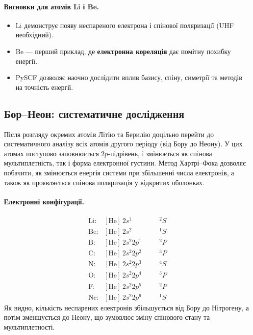 \paragraph{Висновки для атомів Li і Be.}
\begin{itemize}
    \item Li демонструє появу неспареного електрона і спінової поляризації (UHF необхідний).
    \item Be --- перший приклад, де \textbf{електронна кореляція} дає помітну похибку енергії.
    \item PySCF дозволяє наочно дослідити вплив базису, спіну, симетрії та методів на точність енергії.
\end{itemize}


\subsection{Бор--Неон: систематичне дослідження}

Після розгляду окремих атомів Літію та Берилію доцільно перейти до систематичного аналізу всіх атомів другого періоду (від Бору до Неону).
У цих атомах поступово заповнюється \(2p\)-підрівень, і змінюється як спінова мультиплетність, так і форма електронної густини.
Метод Хартрі–Фока дозволяє побачити, як змінюється енергія системи при збільшенні числа електронів, а також як проявляється спінова поляризація у відкритих оболонках.

\paragraph{Електронні конфігурації.}
\[
    \begin{array}{llcl}
        \text{Li:} & [\text{He}]\,2s^1      & \quad & {}^2S \\
        \text{Be:} & [\text{He}]\,2s^2      &       & {}^1S \\
        \text{B:}  & [\text{He}]\,2s^2 2p^1 &       & {}^2P \\
        \text{C:}  & [\text{He}]\,2s^2 2p^2 &       & {}^3P \\
        \text{N:}  & [\text{He}]\,2s^2 2p^3 &       & {}^4S \\
        \text{O:}  & [\text{He}]\,2s^2 2p^4 &       & {}^3P \\
        \text{F:}  & [\text{He}]\,2s^2 2p^5 &       & {}^2P \\
        \text{Ne:} & [\text{He}]\,2s^2 2p^6 &       & {}^1S
    \end{array}
\]
Як видно, кількість неспарених електронів збільшується від Бору до Нітрогену, а потім зменшується до Неону, що зумовлює зміну спінового стану та мультиплетності.


